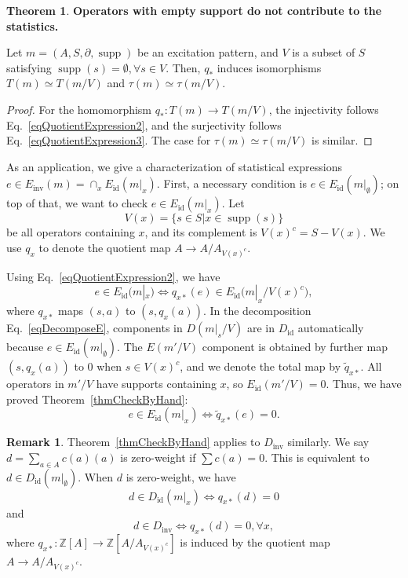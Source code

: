 \documentclass[reprint, amsmath, amssymb, showpacs, floatfix, longbibliography, aps, twocolumn, superscriptaddress, nofootinbib]{revtex4-2}
\newcommand{\ZZ}{{\mathbb Z}}
\newcommand{\supp}{\operatorname{supp}}
\newcommand{\id}{{\operatorname{id}}}
\newcommand{\inv}{{\operatorname{inv}}}
\theoremstyle{definition}
\newtheorem{theorem}{Theorem}[section]
\newtheorem{remark}{Remark}[section]
\begin{document}
\begin{theorem}\label{thmQuotientEmptySupport} \textbf{Operators with empty support do not contribute to the statistics.}
	
	Let $m=(A,S,\partial,\supp)$ be an excitation pattern, and $V$ is a subset of $S$ satisfying $\supp(s)=\emptyset, \forall s\in V$.  Then, $q_*$ induces isomorphisms $T(m)\simeq T(m/V)$ and $\tau(m)\simeq \tau(m/V)$.
\end{theorem}
\begin{proof}
	For the homomorphism $q_*:T(m)\rightarrow T(m/V)$, the injectivity follows Eq.~\eqref{eqQuotientExpression2}, and the surjectivity follows Eq.~\eqref{eqQuotientExpression3}. The case for $\tau(m)\simeq \tau(m/V)$ is similar.
\end{proof}




As an application, we give a characterization of statistical expressions $e\in E_\inv(m)=\cap_xE_\id(m|_x)$. First, a necessary condition is $e\in E_\id(m|_\emptyset)$; on top of that, we want to check $e\in E_\id(m|_x)$. Let
\begin{equation}\label{eqVx}
	V(x)=\{s\in S|x\in \supp(s)\}
\end{equation}
 be all operators containing $x$, and its complement is $V(x)^c=S-V(x)$. We use $q_x$ to denote the quotient map $A\rightarrow A/A_{V(x)^c}$.
 
 Using Eq.~\eqref{eqQuotientExpression2}, we have
\begin{equation}
	e\in E_\id(m|_x)\iff q_{x*}(e)\in E_\id\big(m|_x/V(x)^c\big),
\end{equation}
where $q_{x*}$ maps $(s,a)$ to $(s,q_x(a))$. In the decomposition Eq.~\eqref{eqDecomposeE}, components in $D(m|_s/V)$ are in $D_\id$ automatically because $e\in E_\id(m|_\emptyset)$. The $E(m'/V)$ component is obtained by further map $(s,q_x(a))$ to $0$ when $s\in V(x)^c$, and we denote the total map by $\tilde{q}_{x*}$. All operators in $m'/V$ have supports containing $x$, so $E_\id(m'/V)=0$. Thus, we have proved Theorem~\ref{thmCheckByHand}:
\begin{equation}
	e\in E_\id(m|_x)\iff \tilde{q}_{x*}(e)=0.
\end{equation}

\begin{remark}
	Theorem~\ref{thmCheckByHand} applies to $D_\inv$ similarly. We say $d=\sum_{a\in A} c(a)(a)$ is zero-weight if $\sum c(a)=0$. This is equivalent to $d\in D_\id(m|_\emptyset)$. When $d$ is zero-weight, we have
	\begin{equation}
		d\in D_\id(m|_x)\iff q_{x*}(d)=0
	\end{equation}
	and
	\begin{equation}\label{eqDinv}
		d\in D_\inv\iff q_{x*}(d)=0,\forall x,
	\end{equation}
	where $q_{x*}: \ZZ[A]\rightarrow \ZZ[A/A_{V(x)^c}]$ is induced by the quotient map $A\rightarrow A/A_{V(x)^c}$.
\end{remark}
\end{document}
